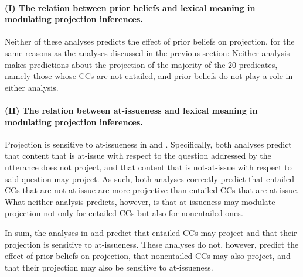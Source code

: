 \documentclass[11pt,fleqn]{article}
\newcommand{\6}{\mbox{$[\hspace*{-.6mm}[$}}
\newcommand{\9}{\mbox{$]\hspace*{-.6mm}]$}}
\begin{document}
\paragraph{(I) The relation between prior beliefs and lexical meaning in modulating projection inferences.}

Neither of these analyses predicts the effect of prior beliefs on projection, for the same reasons as the analyses discussed in the previous section: Neither analysis makes predictions about the projection of the majority of the 20 predicates, namely those whose CCs are not entailed, and prior beliefs do not play a role in either analysis.

\paragraph{(II) The relation between at-issueness and lexical meaning in modulating projection inferences.}

Projection is sensitive to at-issueness in \cite{abrusan2011,abrusan2016} and \cite{best-question}. Specifically, both analyses predict that content that is at-issue with respect to the question addressed by the utterance does not project, and that content that is not-at-issue with respect to said question may project. As such, both analyses correctly predict that entailed CCs that are not-at-issue are more projective than entailed CCs that are at-issue. What neither analysis predicts, however, is that at-issueness may modulate projection not only for entailed CCs but also for nonentailed ones. 

\bigskip

In sum, the analyses in \cite{abrusan2011,abrusan2016} and \cite{best-question} predict that entailed CCs may project and that their projection is sensitive to at-issueness.  These analyses do not, however, predict the effect of prior beliefs on projection, that nonentailed CCs may also project, and that their projection may also be sensitive to at-issueness.

\subsection{\cite{schlenker2021}}
\end{document}
